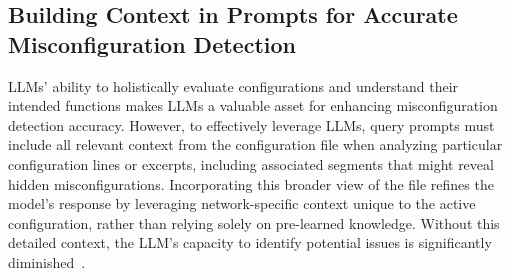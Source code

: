 %

\subsection{Building Context in Prompts for Accurate Misconfiguration Detection}
\label{sec:background:context}

LLMs' ability to
holistically evaluate configurations and understand their intended functions
makes LLMs a valuable asset for enhancing misconfiguration detection accuracy.
However, to effectively leverage LLMs, query prompts must include all relevant
context from the configuration file when analyzing particular configuration lines
or excerpts, including associated segments that might reveal hidden
misconfigurations. Incorporating this broader view of the file refines the
model’s response by leveraging network-specific context unique to the active
configuration, rather than relying solely on pre-learned knowledge. Without
this detailed context, the LLM’s capacity to identify potential issues is
significantly diminished~\cite{liskavets2024prompt,tian2024examining,khurana2024and,
	shvartzshnaider2024llm}.

